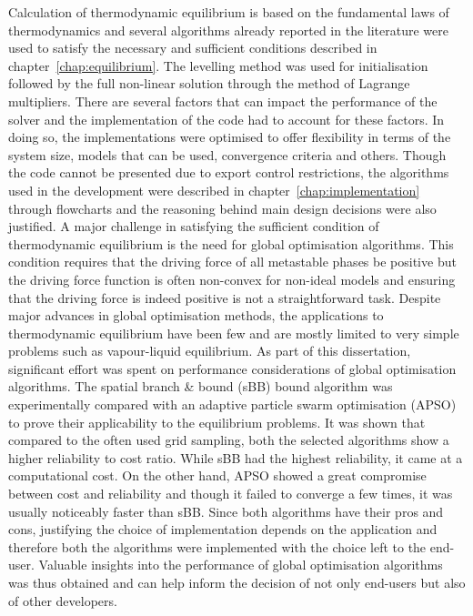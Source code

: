 	Calculation of thermodynamic equilibrium is based on the fundamental laws of thermodynamics and several algorithms already reported in the literature were used to satisfy the necessary and sufficient conditions described in chapter~\ref{chap:equilibrium}. The levelling method was used for initialisation followed by the full non-linear solution through the method of Lagrange multipliers. There are several factors that can impact the performance of the solver and the implementation of the code had to account for these factors. In doing so, the implementations were optimised to offer flexibility in terms of the system size, models that can be used, convergence criteria and others. Though the code cannot be presented due to export control restrictions, the algorithms used in the development were described in chapter~\ref{chap:implementation} through flowcharts and the reasoning behind main design decisions were also justified. A major challenge in satisfying the sufficient condition of thermodynamic equilibrium is the need for global optimisation algorithms. This condition requires that the driving force of all metastable phases be positive but the driving force function is often non-convex for non-ideal models and ensuring that the driving force is indeed positive is not a straightforward task. Despite major advances in global optimisation methods, the applications to thermodynamic equilibrium have been few and are mostly limited to very simple problems such as vapour-liquid equilibrium. As part of this dissertation, significant effort was spent on performance considerations of global optimisation algorithms. The spatial branch \& bound (sBB) bound algorithm was experimentally compared with an adaptive particle swarm optimisation (APSO) to prove their applicability to the equilibrium problems. It was shown that compared to the often used grid sampling, both the selected algorithms show a higher reliability to cost ratio. While sBB had the highest reliability, it came at a computational cost. On the other hand, APSO showed a great compromise between cost and reliability and though it failed to converge a few times, it was usually noticeably faster than sBB. Since both algorithms have their pros and cons, justifying the choice of implementation depends on the application and therefore both the algorithms were implemented with the choice left to the end-user. Valuable insights into the performance of global optimisation algorithms was thus obtained and can help inform the decision of not only end-users but also of other developers.
	
